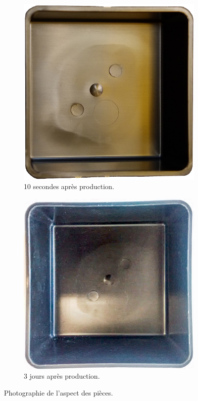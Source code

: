 \begin{figure}[hbtp]
	\centering
	\begin{subfigure}[c]{0.48\textwidth}
		\includegraphics[width=\textwidth]{../Chap2/Figures/163-35_r.jpeg}
		\caption{10 secondes après production.}
	\end{subfigure}
	\begin{subfigure}[c]{0.48\textwidth}
		\includegraphics[width=\textwidth]{../Chap2/Figures/IMG_20170620_141425887r.jpg}
		\caption{3 jours après production.}
	\end{subfigure}
	\caption{Photographie de l'aspect des pièces.}
	\label{fig:correlation_aspect}
\end{figure}

